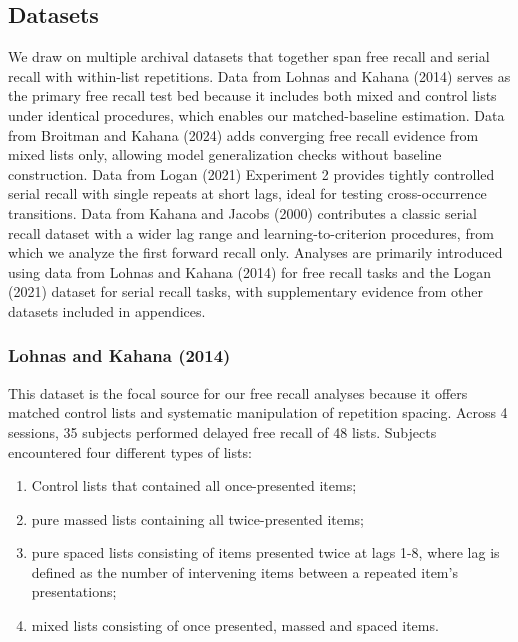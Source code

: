 \documentclass[
  letterpaper,
  11pt,
  english,
  singlespacing,
  headsepline]{MastersDoctoralThesis}
\providecommand{\tightlist}{%
  \setlength{\itemsep}{0pt}\setlength{\parskip}{0pt}}\usepackage{longtable,booktabs,array}
\begin{document}
\subsection{Datasets}\label{datasets-2}

We draw on multiple archival datasets that together span free recall and
serial recall with within-list repetitions. Data from Lohnas and Kahana
(2014) serves as the primary free recall test bed because it includes
both mixed and control lists under identical procedures, which enables
our matched-baseline estimation. Data from Broitman and Kahana (2024)
adds converging free recall evidence from mixed lists only, allowing
model generalization checks without baseline construction. Data from
Logan (2021) Experiment 2 provides tightly controlled serial recall with
single repeats at short lags, ideal for testing cross-occurrence
transitions. Data from Kahana and Jacobs (2000) contributes a classic
serial recall dataset with a wider lag range and learning-to-criterion
procedures, from which we analyze the first forward recall only.
Analyses are primarily introduced using data from Lohnas and Kahana
(2014) for free recall tasks and the Logan (2021) dataset for serial
recall tasks, with supplementary evidence from other datasets included
in appendices.

\subsubsection{Lohnas and Kahana (2014)}\label{lohnas2014retrieved}

This dataset is the focal source for our free recall analyses because it
offers matched control lists and systematic manipulation of repetition
spacing. Across 4 sessions, 35 subjects performed delayed free recall of
48 lists. Subjects encountered four different types of lists:

\begin{enumerate}
\def\labelenumi{\arabic{enumi}.}
\tightlist
\item
  Control lists that contained all once-presented items;
\item
  pure massed lists containing all twice-presented items;
\item
  pure spaced lists consisting of items presented twice at lags 1-8,
  where lag is defined as the number of intervening items between a
  repeated item's presentations;
\item
  mixed lists consisting of once presented, massed and spaced items.
\end{enumerate}
\end{document}
